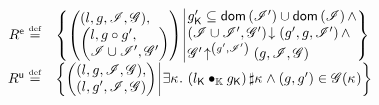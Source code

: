 \begin{definition}[Rely]
%
\[
\begin{array}{r l}
	\extendR \eqdef & 
	\left\{
  \begin{array}{@{} l @{\hspace*{2pt}} | @{\hspace*{2pt}} r @{}}
    \left(
    \begin{array}{@{} l @{}}
      (l , g, \lmod, \gmod),\\
      \left(
      \begin{array}{@{} l @{}}
	l,
	g \composeL g',\\
	\lmod \cup \lmod', \gmod'
      \end{array}
      \right)
    \end{array}
    \right)
    &
    \begin{array}{@{} l @{}}
      \capPart{g'} \subseteq \dom{\lmod'} \cup \dom{\lmod} \land \\
      \extendsAM{\lmod \cup \lmod', \gmod'}{g'}{g}{\lmod'} \land \\
      \expandsAM{\gmod'}{g'}{\lmod'}{g}{\lmod}{\gmod}
    \end{array}
  \end{array}
  \right\}\\
	
	
	\updateR \eqdef & 
	\left\{
  \begin{array}{@{} l @{\hspace*{2pt}} | @{\hspace*{2pt}} r @{}}
    \left(
    \begin{array}{@{} l @{}}
      (l, g, \lmod, \gmod),\\
      (l, g', \lmod, \gmod)
    \end{array}
    \right)
    &
    \begin{array}{@{} l @{} }
      \begin{array}{@{} l @{}}
	\exsts{\ca{} }\left( \capPart{l} \composeCap \capPart{g} \right) \disjoint \ca{} \land 
	(g, g') \in \gmod(\ca{}) \\
      \end{array}	
    \end{array}
  \end{array}
  \right\}\\
	

\end{array}\]
\end{definition}
